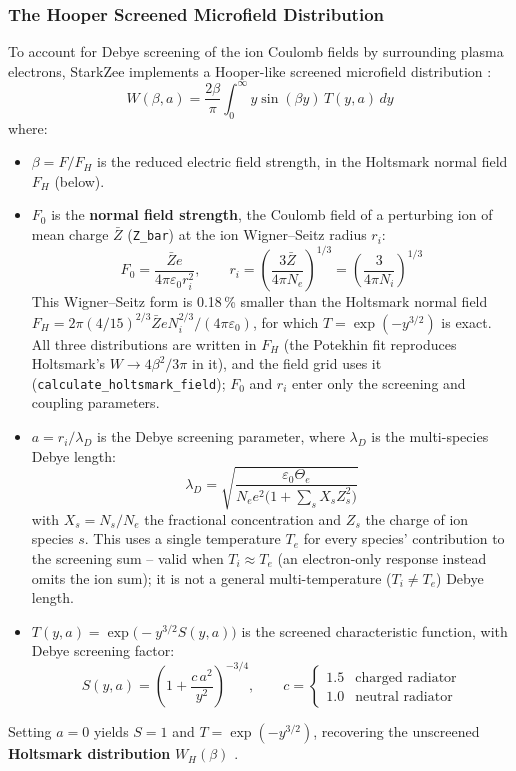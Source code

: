 \documentclass[11pt,a4paper]{article}
\numberwithin{equation}{section}
\begin{document}
\subsubsection{The Hooper Screened Microfield Distribution}
To account for Debye screening of the ion Coulomb fields by surrounding plasma electrons, StarkZee implements a Hooper-like screened microfield distribution \cite{hooper}:
\begin{equation}
W(\beta, a) = \frac{2\beta}{\pi} \int_0^\infty y \sin(\beta y)\, T(y, a)\, dy
\end{equation}
where:
\begin{itemize}
    \item $\beta = F / F_H$ is the reduced electric field strength, in the Holtsmark normal field $F_H$ (below).
    \item $F_0$ is the \textbf{normal field strength}, the Coulomb field of a perturbing ion of mean charge $\bar Z$ (\texttt{Z\_bar}) at the ion Wigner--Seitz radius $r_i$:
    \begin{equation}
    F_0 = \frac{\bar Z e}{4\pi\varepsilon_0 r_i^2}, \qquad r_i = \left(\frac{3\bar Z}{4\pi N_e}\right)^{1/3} = \left(\frac{3}{4\pi N_i}\right)^{1/3}
    \end{equation}
    This Wigner--Seitz form is 0.18\,\% smaller than the Holtsmark normal field $F_H = 2\pi(4/15)^{2/3}\bar Z e N_i^{2/3}/(4\pi\varepsilon_0)$, for which $T=\exp(-y^{3/2})$ is exact. All three distributions are written in $F_H$ (the Potekhin fit reproduces Holtsmark's $W\to4\beta^2/3\pi$ in it), and the field grid uses it (\texttt{calculate\_holtsmark\_field}); $F_0$ and $r_i$ enter only the screening and coupling parameters.
    \item $a = r_i / \lambda_D$ is the Debye screening parameter, where $\lambda_D$ is the multi-species Debye length:
    \begin{equation}
    \lambda_D = \sqrt{\frac{\varepsilon_0 \Theta_e}{N_e e^2 \bigl(1 + \sum_s X_s Z_s^2\bigr)}}
    \end{equation}
    with $X_s = N_s / N_e$ the fractional concentration and $Z_s$ the charge of ion species $s$.  This uses a single temperature $T_e$ for every species' contribution to the screening sum -- valid when $T_i \approx T_e$ (an electron-only response instead omits the ion sum); it is not a general multi-temperature ($T_i \neq T_e$) Debye length.
    \item $T(y, a) = \exp\!\bigl(-y^{3/2} S(y,a)\bigr)$ is the screened characteristic function, with Debye screening factor:
    \begin{equation}
    S(y, a) = \left(1 + \frac{c\,a^2}{y^2}\right)^{-3/4}, \qquad c = \begin{cases} 1.5 & \text{charged radiator} \\ 1.0 & \text{neutral radiator} \end{cases}
    \end{equation}
\end{itemize}
Setting $a = 0$ yields $S = 1$ and $T = \exp(-y^{3/2})$, recovering the unscreened \textbf{Holtsmark distribution} $W_H(\beta)$ \cite{holtsmark}.
\end{document}
